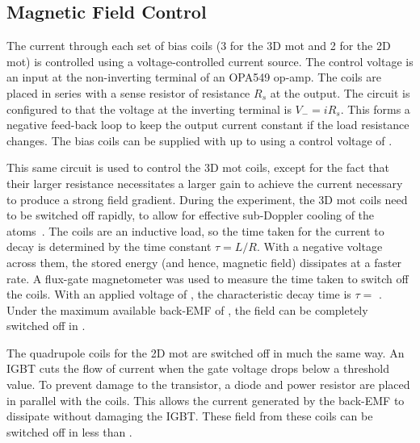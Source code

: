 \subsection{Magnetic Field Control}\label{subsec:coil_control} 
The current through each set of
bias coils (3 for the 3D \ac{mot} and 2 for the 2D \ac{mot}) is
controlled using a voltage-controlled current source. The control
voltage is an input at the non-inverting terminal of an OPA549 op-amp.
The coils are placed in series with a sense resistor of resistance
\(R_s\) at the output. The circuit is configured to that the voltage
at the inverting terminal is \(V_- = i R_s\).  This forms a negative
feed-back loop to keep the output current constant if the load
resistance changes. The bias coils can be supplied with up to
 using a control voltage of .
\par\noindent This same circuit is used to control the 3D \ac{mot}
coils, except for the fact that their larger resistance necessitates a
larger gain to achieve the current necessary to produce a strong field
gradient. During the experiment, the 3D \ac{mot} coils need to be
switched off rapidly, to allow for effective sub-Doppler cooling of
the atoms~\cite{Dedman2001}. The coils are an inductive load, so the time taken for the
current to decay is determined by the time constant \(\tau = L/R\).
With a negative voltage across them, the stored energy (and hence,
magnetic field) dissipates at a faster rate. A flux-gate magnetometer
was used to measure the time taken to switch off the coils. With an
applied voltage of , the characteristic decay time
is \(\tau = \) . Under the maximum
available back-EMF of , the field can be
completely switched off in . \par\noindent
The quadrupole coils for the 2D \ac{mot} are switched off in much the
same way. An IGBT cuts the flow of current when the gate voltage drops
below a threshold value. To prevent damage to the transistor, a diode
and  power resistor are placed in parallel with the
coils. This allows the current generated by the back-EMF to dissipate
without damaging the IGBT. These field from these coils can be
switched off in less than .

